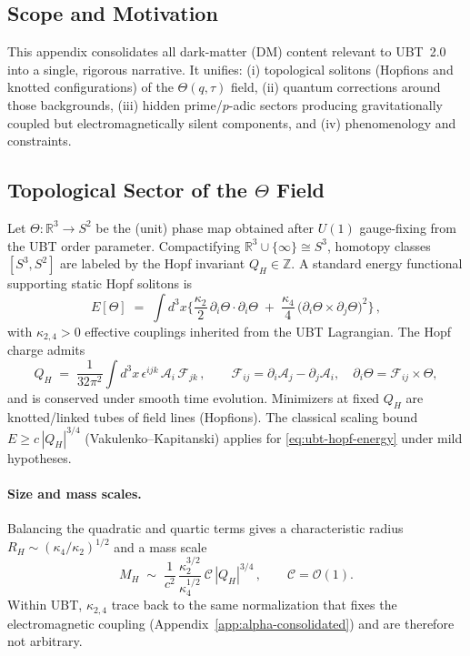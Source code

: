 \documentclass[12pt,a4paper]{article}
\numberwithin{equation}{section}
\theoremstyle{definition}
\theoremstyle{remark}
\begin{document}
\subsection{Scope and Motivation}
This appendix consolidates all dark-matter (DM) content relevant to UBT~2.0 into a single, rigorous narrative.
It unifies: (i) topological solitons (Hopfions and knotted configurations) of the $\Theta(q,\tau)$ field,
(ii) quantum corrections around those backgrounds, (iii) hidden prime/$p$-adic sectors producing gravitationally coupled but electromagnetically silent components,
and (iv) phenomenology and constraints.

\subsection{Topological Sector of the $\Theta$ Field}
Let $\Theta:\mathbb{R}^3\!\to\!S^2$ be the (unit) phase map obtained after $U(1)$ gauge-fixing from the UBT order parameter.
Compactifying $\mathbb{R}^3\cup\{\infty\}\cong S^3$, homotopy classes $[S^3,S^2]$ are labeled by the Hopf invariant $Q_H\in\mathbb{Z}$.
A standard energy functional supporting static Hopf solitons is
\begin{equation}
\label{eq:ubt-hopf-energy}
E[\Theta] \;=\; \int d^3x \Big\{ \frac{\kappa_2}{2}\,\partial_i\Theta\!\cdot\!\partial_i\Theta \;+\; \frac{\kappa_4}{4}\,\big(\partial_i\Theta\times\partial_j\Theta\big)^2 \Big\}\,,
\end{equation}
with $\kappa_{2,4}>0$ effective couplings inherited from the UBT Lagrangian. The Hopf charge admits
\begin{equation}
Q_H \;=\; \frac{1}{32\pi^2}\int d^3x\,\epsilon^{ijk}\,\mathcal{A}_i\,\mathcal{F}_{jk}\,,\qquad
\mathcal{F}_{ij}=\partial_i\mathcal{A}_j-\partial_j\mathcal{A}_i,\quad
\partial_i\Theta=\mathcal{F}_{ij}\times \Theta,
\end{equation}
and is conserved under smooth time evolution. Minimizers at fixed $Q_H$ are knotted/linked tubes of field lines (Hopfions).
The classical scaling bound $E \ge c\,|Q_H|^{3/4}$ (Vakulenko--Kapitanski) applies for \eqref{eq:ubt-hopf-energy} under mild hypotheses.

\paragraph{Size and mass scales.}
Balancing the quadratic and quartic terms gives a characteristic radius $R_H\sim(\kappa_4/\kappa_2)^{1/2}$ and a mass scale
\begin{equation}
M_H \;\sim\; \frac{1}{c^2}\,\frac{\kappa_2^{3/2}}{\kappa_4^{1/2}}\ \mathcal{C}\,|Q_H|^{3/4}\,,\qquad \mathcal{C}=\mathcal{O}(1).
\end{equation}
Within UBT, $\kappa_{2,4}$ trace back to the same normalization that fixes the electromagnetic coupling (Appendix~\ref{app:alpha-consolidated})
and are therefore not arbitrary.
\end{document}
